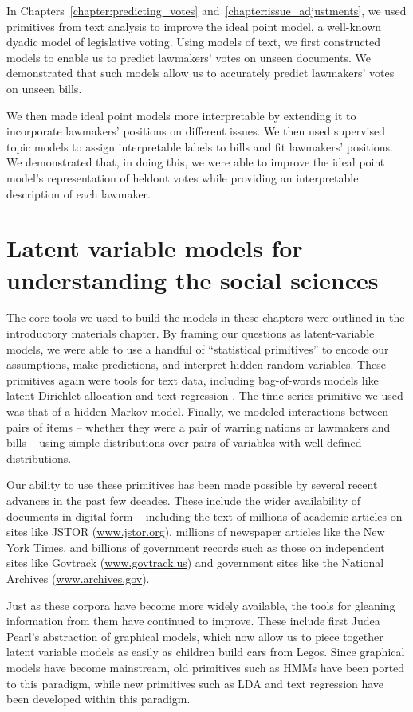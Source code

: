In Chapters~\ref{chapter:predicting_votes}
and~\ref{chapter:issue_adjustments}, we used primitives from text
analysis to improve the ideal point model, a well-known dyadic model
of legislative voting. Using models of text, we first constructed
models to enable us to predict lawmakers' votes on unseen documents.
We demonstrated that such models allow us to accurately predict
lawmakers' votes on unseen bills.

We then made ideal point models more interpretable by extending it to
incorporate lawmakers' positions on different issues.  We then used
supervised topic models to assign interpretable labels to bills and
fit lawmakers' positions.  We demonstrated that, in doing this, we
were able to improve the ideal point model's representation of heldout
votes while providing an interpretable description of each lawmaker.

\section{Latent variable models for understanding the social sciences}
The core tools we used to build the models in these chapters were
outlined in the introductory materials chapter.  By framing our
questions as latent-variable models, we were able to use a handful of
``statistical primitives'' to encode our assumptions, make
predictions, and interpret hidden random variables.  These primitives
again were tools for text data, including bag-of-words models like
latent Dirichlet allocation \citep{blei:2006} and text regression
\citep{kogan:2009}.  The time-series primitive we used was that
of a hidden Markov model.  Finally, we modeled interactions between
pairs of items -- whether they were a pair of warring nations or lawmakers and
bills -- using simple distributions over pairs of variables with
well-defined distributions.

Our ability to use these primitives has been made possible by several
recent advances in the past few decades.  These include the wider
availability of documents in digital form -- including the text of
millions of academic articles on sites like JSTOR (\url{www.jstor.org}), millions of
newspaper articles like the New York Times, and billions of government
records such as those on independent sites like Govtrack
(\url{www.govtrack.us}) and government sites like the National
Archives (\url{www.archives.gov}).

Just as these corpora have become more widely available, the tools for
gleaning information from them have continued to improve.  These
include first Judea Pearl's abstraction of graphical models,
which now allow us to piece together latent variable models as easily
as children build cars from Legos\texttrademark \citep{pearl:1985}.  Since graphical
models have become mainstream, old primitives such as HMMs have been
ported to this paradigm, while new primitives such as LDA and text
regression have been developed within this paradigm.

